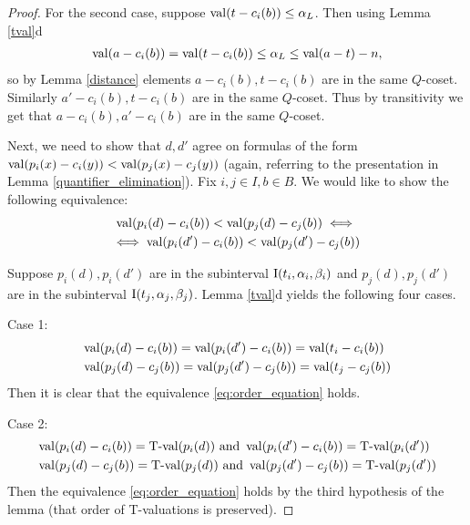 \begin{proof}
  For the second case, suppose $\operatorname{val}(t - c_i(b)) \leq \alpha_L$.
  Then using Lemma \ref{tval}d
  \begin{align*}
    \operatorname{val}(a - c_i(b)) = \operatorname{val}(t - c_i(b)) \leq \alpha_L \leq \operatorname{val}(a - t) - n,
  \end{align*}
  so by Lemma \ref{distance} elements $a - c_i(b), t - c_i(b)$ are in the same $Q$-coset.
  Similarly $a' - c_i(b), t - c_i(b)$ are in the same $Q$-coset.
  Thus by transitivity we get that $a - c_i(b), a' - c_i(b)$ are in the same $Q$-coset.

  Next, we need to show that $d, d'$ agree on formulas of the form
  $\operatorname{val} (p_i(x) - c_i(y)) < \operatorname{val} (p_j(x) - c_j(y))$ 
  (again, referring to the presentation in Lemma \ref{quantifier_elimination}).
  Fix $i,j \in I, b \in B$.
  We would like to show the following equivalence: 
  \begin{multline} \label {eq:order_equation}
    \operatorname{val} (p_i(d) - c_i(b)) < \operatorname{val} (p_j(d) - c_j(b)) \iff \\
    \iff \operatorname{val} (p_i(d') - c_i(b)) < \operatorname{val} (p_j(d') - c_j(b))
  \end{multline}

  Suppose $p_i(d), p_i(d')$ are in the subinterval $\operatorname{I}(t_i, \alpha_i, \beta_i)$ and 
  $p_j(d), p_j(d')$ are in the subinterval $\operatorname{I}(t_j, \alpha_j, \beta_j)$.
  Lemma \ref{tval}d yields the following four cases.

  Case 1:
  \begin{align*}
    &\operatorname{val} (p_i(d) - c_i(b)) = \operatorname{val} (p_i(d') - c_i(b)) = \operatorname{val}(t_i - c_i(b)) \\
    &\operatorname{val} (p_j(d) - c_j(b)) = \operatorname{val} (p_j(d') - c_j(b)) = \operatorname{val}(t_j - c_j(b))
  \end{align*}
  Then it is clear that the equivalence \eqref{eq:order_equation} holds.

  Case 2:
  \begin{align*}
    &\operatorname{val} (p_i(d) - c_i(b)) = \operatorname{T-val}(p_i(d)) \text{ and } \operatorname{val} (p_i(d') - c_i(b)) = \operatorname{T-val}(p_i(d')) \\
    &\operatorname{val} (p_j(d) - c_j(b)) = \operatorname{T-val}(p_j(d)) \text{ and } \operatorname{val} (p_j(d') - c_j(b)) = \operatorname{T-val}(p_j(d'))
  \end{align*}
  Then the equivalence \eqref{eq:order_equation} holds by the third hypothesis of the lemma (that order of T-valuations is preserved).


\end{proof}

